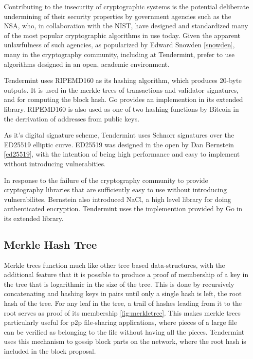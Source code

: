 Contributing to the insecurity of cryptographic systems is the potential deliberate undermining of their security properties by government agencies 
such as the NSA, who, in collaboration with the NIST, have designed and standardized many of the most popular cryptographic algorithms in use today. 
Given the apparent unlawfulness of such agencies, as popularized by Edward Snowden \ref{snowden}, 
many in the cryptography community, including at Tendermint, prefer to use algorithms designed in an open, academic environment.

Tendermint uses RIPEMD160 as its hashing algorithm, which produces 20-byte outputs. 
It is used in the merkle trees of transactions and validator signatures, and for computing the block hash.
Go provides an implemention in its extended library. RIPEMD160 is also used as one of two hashing functions by Bitcoin in the derrivation of addresses from public keys.

As it's digital signature scheme, Tendermint uses Schnorr signatures over the ED25519 elliptic curve. 
ED25519 was designed in the open by Dan Bernstein \ref{ed25519}, with the intention of being high performance and easy to implement without introducing vulnerabities.

In response to the failure of the cryptography community to provide cryptography libraries that are sufficiently easy to use without introducing vulnerabilites,
Bernstein also introduced NaCl, a high level library for doing authenticated encryption. Tendermint uses the implemention provided by Go in its extended library.

\subsection{Merkle Hash Tree}

Merkle trees function much like other tree based data-structures, 
with the additional feature that it is possible to produce a proof of membership of a key in the tree that is logarithmic in the size of the tree.
This is done by recursively concatenating and hashing keys in pairs until only a single hash is left, the root hash of the tree.
For any leaf in the tree, a trail of hashes leading from it to the root serves as proof of its membership \ref{fig:merkletree}.
This makes merkle trees particularly useful for p2p file-sharing applications, where pieces of a large file can be verified as belonging to the file without
having all the pieces. Tendermint uses this mechanism to gossip block parts on the network, where the root hash is included in the block proposal.

